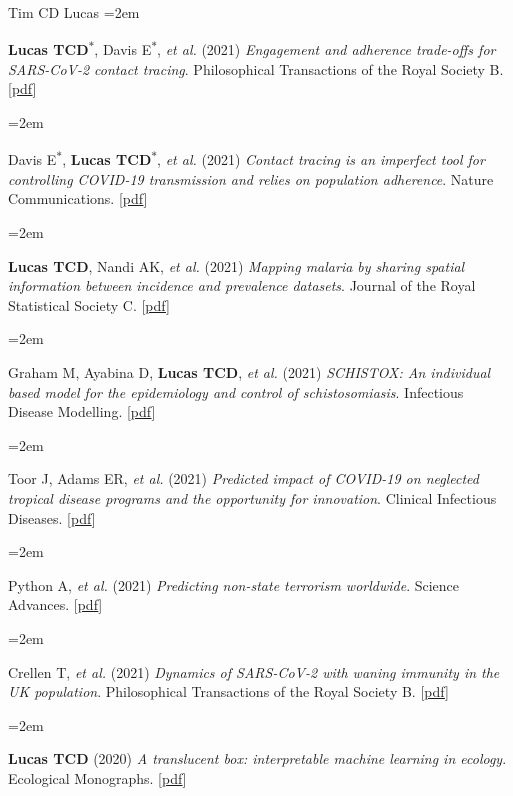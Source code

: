 \documentclass{scrartcl}
\newcommand{\MarginText}[1]{\marginpar{\raggedleft\itshape\small#1}} %
\newcommand{\Description}[1]{\hangindent=2em\hangafter=0\noindent\raggedright\footnotesize{#1}\par\normalsize\vspace{1em}} %
\begin{document}
\begin{cv}{Tim {\Large CD} Lucas}
\Description{\MarginText{2021}\textbf{Lucas TCD}\textsuperscript{$\ast$}, Davis E\textsuperscript{$\ast$}, \emph{et al.} (2021) \emph{Engagement and adherence trade-offs for SARS-CoV-2 contact tracing}. Philosophical Transactions of the Royal Society B. [\href{https://royalsocietypublishing.org/doi/10.1098/rstb.2020.0270}{pdf}]}



\Description{Davis E\textsuperscript{$\ast$}, \textbf{Lucas TCD}\textsuperscript{$\ast$}, \emph{et al.} (2021) \emph{Contact tracing is an imperfect tool for controlling COVID-19 transmission and relies on population adherence}. Nature Communications. [\href{https://www.nature.com/articles/s41467-021-25531-5}{pdf}]}



\Description{\textbf{Lucas TCD}, Nandi AK,  \emph{et al.} (2021) \emph{Mapping malaria by sharing spatial information between incidence and prevalence datasets}. Journal of the Royal Statistical Society C. [\href{https://rss.onlinelibrary.wiley.com/doi/full/10.1111/rssc.12484}{pdf}]}



\Description{Graham M, Ayabina D, \textbf{Lucas TCD}, \emph{et al.} (2021) \emph{SCHISTOX: An individual based model for the epidemiology and control of schistosomiasis}. Infectious Disease Modelling. [\href{https://www.sciencedirect.com/science/article/pii/S2468042721000130}{pdf}]}


\Description{Toor J, Adams ER, \emph{et al.} (2021) \emph{Predicted impact of COVID-19 on neglected tropical disease programs and the opportunity for innovation}. Clinical Infectious Diseases. [\href{https://www.ncbi.nlm.nih.gov/pmc/articles/PMC7543306/}{pdf}]}


\Description{Python A, \emph{et al.} (2021) \emph{Predicting non-state terrorism worldwide}. Science Advances. [\href{https://www.science.org/doi/full/10.1126/sciadv.abg4778}{pdf}]}


\Description{Crellen T, \emph{et al.} (2021) \emph{Dynamics of SARS-CoV-2 with waning immunity in the UK population}. Philosophical Transactions of the Royal Society B. [\href{https://royalsocietypublishing.org/doi/full/10.1098/rstb.2020.0274}{pdf}]}






\Description{\MarginText{2020}\textbf{Lucas TCD} (2020) \emph{A translucent box: interpretable machine learning in ecology}. Ecological Monographs. [\href{https://esajournals.onlinelibrary.wiley.com/doi/epdf/10.1002/ecm.1422}{pdf}]}





\end{cv}
\end{document}
